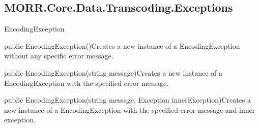 \subsection*{MORR.Core.Data.Transcoding.Exceptions}

\begin{class}{EncodingException}



    \begin{constructors}
        \begin{constructor}{public EncodingException()}{Creates a new instance of a EncodingException without any specific error message.}
        \end{constructor}
        \begin{constructor}{public EncodingException(string message)}{Creates a new instance of a EncodingException with the specified error message.}
            \begin{parameters}
            \end{parameters}
        \end{constructor}
        \begin{constructor}{public EncodingException(string message, Exception innerException)}{Creates a new instance of a EncodingException with the specified error message and inner exception.}
            \begin{parameters}
            \end{parameters}
        \end{constructor}
    \end{constructors}
\end{class}


